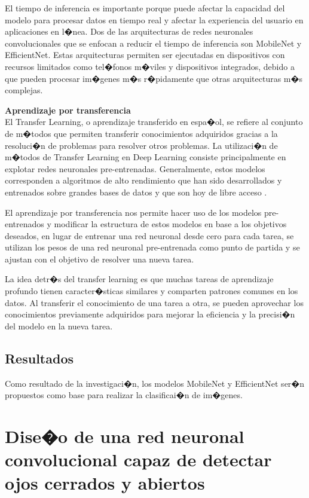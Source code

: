 \documentclass[12pt,letterpaper]{article}
\begin{document}
El tiempo de inferencia es importante porque puede afectar la capacidad del modelo para procesar datos en tiempo real y afectar la experiencia del usuario en aplicaciones en l�nea. Dos de las arquitecturas de redes neuronales convolucionales que se enfocan a reducir el tiempo de inferencia son MobileNet y EfficientNet. Estas arquitecturas permiten ser ejecutadas en dispositivos con recursos limitados como tel�fonos m�viles y dispositivos integrados, debido a que pueden procesar im�genes m�s r�pidamente que otras arquitecturas m�s complejas. 
 
\textbf{Aprendizaje por transferencia}\\

El Transfer Learning, o aprendizaje transferido en espa�ol, se refiere al conjunto de m�todos que permiten transferir conocimientos adquiridos gracias a la resoluci�n de problemas para resolver otros problemas. La utilizaci�n de m�todos de Transfer Learning en Deep Learning consiste principalmente en explotar redes neuronales pre-entrenadas. Generalmente, estos modelos corresponden a algoritmos de alto rendimiento que han sido desarrollados y entrenados sobre grandes bases de datos y que son hoy de libre acceso \cite{TLe}.


El aprendizaje por transferencia nos permite hacer uso de los modelos pre-entrenados y modificar la estructura de estos modelos en base a los objetivos deseados, en lugar de entrenar una red neuronal desde cero para cada tarea, se utilizan los pesos de una red neuronal pre-entrenada como punto de partida y se ajustan con el objetivo de resolver una nueva tarea. 

La idea detr�s del transfer learning es que muchas tareas de aprendizaje profundo tienen caracter�sticas similares y comparten patrones comunes en los datos. Al transferir el conocimiento de una tarea a otra, se pueden aprovechar los conocimientos previamente adquiridos para mejorar la eficiencia y la precisi�n del modelo en la nueva tarea.


\subsection{Resultados}

Como resultado de la investigaci�n, los modelos MobileNet y EfficientNet ser�n propuestos como base para realizar la clasificai�n de im�genes. 

\clearpage
\section{Dise�o de una red neuronal convolucional capaz de detectar ojos cerrados y abiertos}
\end{document}
